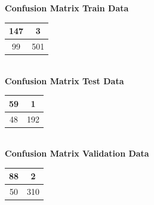 \documentclass{article}
\begin{document}
\begin{flushleft}
\textbf{Confusion Matrix Train Data\\[5pt]}
\begin{tabular}{|c|c|}
\hline
147 & 3 \\
\hline
99 & 501\\
\hline
\end{tabular}
\textbf{\\[10pt] Confusion Matrix Test Data \\[5pt]}
\begin{tabular}{|c|c|}
\hline
59 & 1 \\
\hline
48 & 192\\
\hline
\end{tabular}
\textbf{\\[10pt] Confusion Matrix Validation Data \\[5pt]}
\begin{tabular}{|c|c|}
\hline
88 & 2 \\
\hline
50 & 310\\
\hline
\end{tabular}
\end{flushleft}
\end{document}
